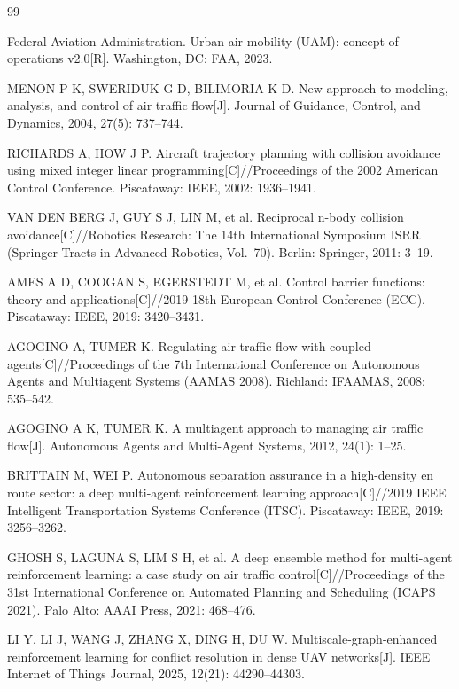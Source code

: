 \documentclass[12pt,a4paper,UTF8]{ctexbook}
\begin{document}
\begin{thebibliography}{99}

 Federal Aviation Administration. Urban air mobility (UAM): concept of operations v2.0[R]. Washington, DC: FAA, 2023.

 MENON P K, SWERIDUK G D, BILIMORIA K D. New approach to modeling, analysis, and control of air traffic flow[J]. Journal of Guidance, Control, and Dynamics, 2004, 27(5): 737--744.

 RICHARDS A, HOW J P. Aircraft trajectory planning with collision avoidance using mixed integer linear programming[C]//Proceedings of the 2002 American Control Conference. Piscataway: IEEE, 2002: 1936--1941.

 VAN DEN BERG J, GUY S J, LIN M, et al. Reciprocal n-body collision avoidance[C]//Robotics Research: The 14th International Symposium ISRR (Springer Tracts in Advanced Robotics, Vol.\ 70). Berlin: Springer, 2011: 3--19.

 AMES A D, COOGAN S, EGERSTEDT M, et al. Control barrier functions: theory and applications[C]//2019 18th European Control Conference (ECC). Piscataway: IEEE, 2019: 3420--3431.

 AGOGINO A, TUMER K. Regulating air traffic flow with coupled agents[C]//Proceedings of the 7th International Conference on Autonomous Agents and Multiagent Systems (AAMAS 2008). Richland: IFAAMAS, 2008: 535--542.

 AGOGINO A K, TUMER K. A multiagent approach to managing air traffic flow[J]. Autonomous Agents and Multi-Agent Systems, 2012, 24(1): 1--25.

 BRITTAIN M, WEI P. Autonomous separation assurance in a high-density en route sector: a deep multi-agent reinforcement learning approach[C]//2019 IEEE Intelligent Transportation Systems Conference (ITSC). Piscataway: IEEE, 2019: 3256--3262.

 GHOSH S, LAGUNA S, LIM S H, et al. A deep ensemble method for multi-agent reinforcement learning: a case study on air traffic control[C]//Proceedings of the 31st International Conference on Automated Planning and Scheduling (ICAPS 2021). Palo Alto: AAAI Press, 2021: 468--476.

 LI Y, LI J, WANG J, ZHANG X, DING H, DU W. Multiscale-graph-enhanced reinforcement learning for conflict resolution in dense UAV networks[J]. IEEE Internet of Things Journal, 2025, 12(21): 44290--44303.


\end{thebibliography}
\end{document}

